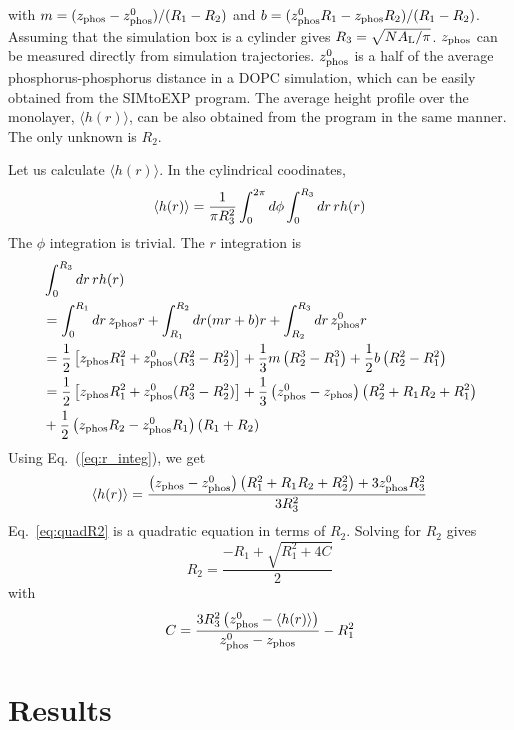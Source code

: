 with $m=(z_\textrm{phos}-z_\textrm{phos}^0)/(R_1-R_2)$ and $b=(z_\textrm{phos}^0R_1-z_\textrm{phos} R_2)/(R_1-R_2)$. 
Assuming that the simulation box is a cylinder gives 
$R_3=\sqrt{NA_\textrm{L}/\pi}$. 
$z_\textrm{phos}$ can be measured directly from simulation trajectories.
$z_\textrm{phos}^0$ is a half of the average phosphorus-phosphorus distance 
in a DOPC simulation,
which can be easily obtained from the SIMtoEXP program. 
The average height profile over
the monolayer, $\langle h(r) \rangle$, can be also obtained from the program 
in the same manner. 
The only unknown is $R_2$.

Let us calculate $\langle h(r) \rangle$. In the cylindrical coodinates, 
\begin{equation}
  \langle h(r) \rangle 
  = \frac{1}{\pi R_3^2} \int_0^{2\pi}d\phi \int_0^{R_3}\mathop{dr} rh(r)
\end{equation}
The $\phi$ integration is trivial. The $r$ integration is
\begin{align}
  & \int_0^{R_3}\mathop{dr} rh(r) \nonumber\\
  &= \int_0^{R_1}\mathop{dr} z_\textrm{phos} r + \int_{R_1}^{R_2}\mathop{dr} (mr+b)r + \int_{R_2}^{R_3}\mathop{dr} z_\textrm{phos}^0r \nonumber\\
  &= \frac{1}{2}\left[z_\textrm{phos} R_1^2+z_\textrm{phos}^0(R_3^2-R_2^2)\right] + 
     \frac{1}{3}m\left(R_2^3-R_1^3\right) + 
     \frac{1}{2}b\left(R_2^2-R_1^2\right) \nonumber\\        
  &= \frac{1}{2}\left[z_\textrm{phos} R_1^2+z_\textrm{phos}^0(R_3^2-R_2^2)\right] +
     \frac{1}{3}\left(z_\textrm{phos}^0-z_\textrm{phos}\right)\left(R_2^2+R_1R_2+R_1^2\right) \nonumber\\
  &  + \frac{1}{2}\left(z_\textrm{phos} R_2-z_\textrm{phos}^0 R_1\right)\left(R_1+R_2\right) \label{eq:r_integ}
\end{align}
Using Eq.~(\ref{eq:r_integ}), we get 
\begin{equation}
  \langle h(r) \rangle 
  = \frac{\left(z_\textrm{phos}-z_\textrm{phos}^0\right)\left(R_1^2+R_1R_2+R_2^2\right)+3z_\textrm{phos}^0R_3^2}{3R_3^2}
  \label{eq:quadR2}
\end{equation}
Eq.~\ref{eq:quadR2} is a quadratic equation in terms of $R_2$. 
Solving for $R_2$ gives
\begin{equation}
  R_2 = \frac{-R_1+\sqrt{R_1^2+4C}}{2} 
\end{equation}
with
\begin{equation}
  C = \frac{3R_3^2\left(z_\textrm{phos}^0-\langle h(r)\rangle\right)}{z_\textrm{phos}^0-z_\textrm{phos}} - R_1^2
\end{equation}

\section{Results}
